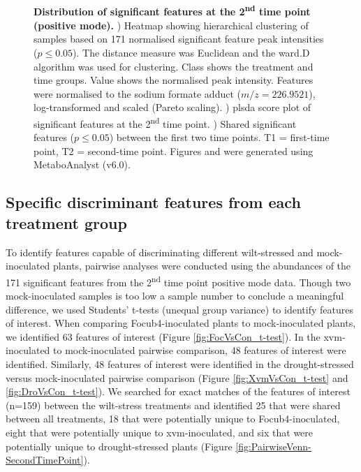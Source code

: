 \begin{figure}[!hptb]
\begin{minipage}[b]{0.57\textwidth}
\begin{subfigure}[b]{\linewidth}
   \end{subfigure}\\[\baselineskip]
  \end{minipage}
  \caption[Distribution of features at the 2\textsuperscript{nd} time point (positive mode).]{\textbf{Distribution of significant features at the 2\textsuperscript{nd} time point (positive mode).}
  \textbf{}) Heatmap showing hierarchical clustering of samples based on 171 normalised significant feature peak intensities ($p \le0.05$). The distance measure was Euclidean and the ward.D algorithm was used for clustering. Class shows the treatment and time groups. Value shows the normalised peak intensity. Features were normalised to the sodium formate   adduct ($m/z=226.9521$), log-transformed and scaled (Pareto scaling). 
  \textbf{}) \acl{plsda} score plot of significant features at the 2\textsuperscript{nd} time point. 
  \textbf{}) Shared significant features ($p \le0.05$) between the first two time points. T1 = first-time point, T2 = second-time point.
  Figures  and  were generated using MetaboAnalyst (v6.0). 
  }
  \label{fig:SecondTimePointSigFig}
\end{figure}

\subsection{Specific discriminant features from each treatment group }

To identify features capable of discriminating different wilt-stressed and mock-inoculated plants, pairwise analyses were conducted using the abundances of the 171 significant features from the 2\textsuperscript{nd} time point positive mode data. Though two mock-inoculated samples is too low a sample number to conclude a meaningful difference, we used Students' t-tests (unequal group variance) to identify features of interest. When comparing \ac{Focub4}-inoculated plants to mock-inoculated plants, we identified 63 features of interest (Figure \ref{fig:FocVsCon_t-test}). In the \ac{xvm}-inoculated to mock-inoculated pairwise comparison, 48 features of interest were identified. Similarly, 48 features of interest were identified in the drought-stressed versus mock-inoculated pairwise comparison (Figure \ref{fig:XvmVsCon_t-test} and \ref{fig:DroVsCon_t-test}). We searched for exact matches of the features of interest (n=159) between the wilt-stress treatments and identified 25 that were shared between all treatments, 18 that were potentially unique to \ac{Focub4}-inoculated, eight that were potentially unique to \ac{xvm}-inoculated, and six that were potentially unique to drought-stressed plants (Figure \ref{fig:PairwiseVenn-SecondTimePoint}).

